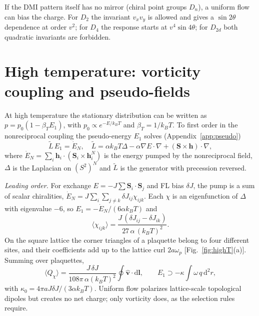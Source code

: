 \documentclass[aps,prb,twocolumn,superscriptaddress,longbibliography,floatfix]{revtex4-2}
\newcommand{\vS}{\mathbf S}
\newcommand{\vh}{\mathbf h}
\newcommand{\vv}{\mathbf v}
\newcommand{\kT}{k_BT}
\newcommand{\dd}{\mathrm d}
\newcommand{\avg}[1]{\langle #1\rangle}
\begin{document}
If the DMI pattern itself has no mirror (chiral point groups $D_n$), a uniform flow can bias the charge. For $D_2$ the invariant $v_xv_y$ is allowed and gives a $\sin2\theta$ dependence at order $v^2$; for $D_4$ the response starts at $v^4\sin4\theta$; for $D_{2d}$ both quadratic invariants are forbidden.

\section{High temperature: vorticity coupling and pseudo-fields}\label{sec:highT}

At high temperature the stationary distribution can be written as $p=p_0(1-\beta_TE_1)$, with $p_0\propto e^{-E/\kT}$ and $\beta_T=1/\kT$. To first order in the nonreciprocal coupling the pseudo-energy $E_1$ solves (Appendix~\ref{app:pseudo})
\begin{equation}
\tilde L\,E_1=\dot E_N,\quad \tilde L=\alpha\kT\Delta-\alpha\nabla E\cdot\nabla+(\vS\times\vh)\cdot\nabla,
\label{eq:pseudo}
\end{equation}
where $\dot E_N=\sum_i\vh_i\cdot(\vS_i\times\vh_i^N)$ is the energy pumped by the nonreciprocal field, $\Delta$ is the Laplacian on $(S^2)^N$ and $\tilde L$ is the generator with precession reversed.

\emph{Leading order.} For exchange $E=-J\sum\vS_i\cdot\vS_j$ and FL bias $\delta J$, the pump is a sum of scalar chiralities, $\dot E_N=J\sum_i\sum_{j\neq k}\delta J_{ij}\chi_{ijk}$. Each $\chi$ is an eigenfunction of $\Delta$ with eigenvalue $-6$, so $E_1=-\dot E_N/(6\alpha\kT)$ and
\begin{equation}
\avg{\chi_{ijk}}=\frac{J\,(\delta J_{ij}-\delta J_{ik})}{27\,\alpha\,(\kT)^2}.
\label{eq:chi}
\end{equation}
On the square lattice the corner triangles of a plaquette belong to four different sites, and their coefficients add up to the lattice curl $2a\omega_p$ [Fig.~\ref{fig:highT}(a)]. Summing over plaquettes,
\begin{equation}
\avg{Q_\chi}=\frac{J\,\delta J}{108\pi\,\alpha(\kT)^2}\oint\hat{\vv}\cdot\dd\mathbf l,\qquad E_1\supset-\kappa\!\int\!\omega\,q\,\dd^2r ,
\label{eq:kappa0}
\end{equation}
with $\kappa_0=4\pi aJ\delta J/(3\alpha\kT)$. Uniform flow polarizes lattice-scale topological dipoles but creates no net charge; only vorticity does, as the selection rules require.
\end{document}

